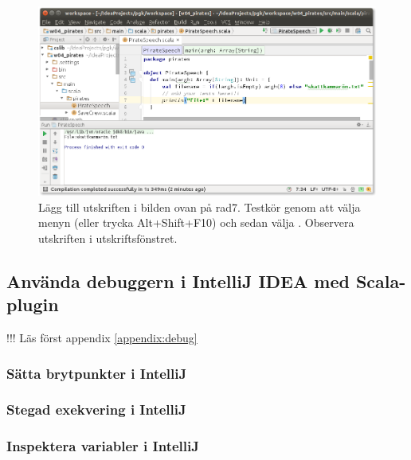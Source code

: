 \begin{figure}
\centering
\includegraphics[width=1.0\textwidth]{../img/intellij/idea-import9-run.png}
\caption{Lägg till utskriften i bilden ovan på rad7. Testkör genom att välja menyn  (eller trycka Alt+Shift+F10) och sedan välja . Observera utskriften i utskriftsfönstret.}
\label{fig:idea:import9-run}
\end{figure}

\clearpage

\subsection{Använda debuggern i IntelliJ IDEA med Scala-plugin}

!!! Läs först appendix \ref{appendix:debug}

\subsubsection{Sätta brytpunkter i IntelliJ}\TODO
\subsubsection{Stegad exekvering i IntelliJ}\TODO
\subsubsection{Inspektera variabler i IntelliJ}\TODO
